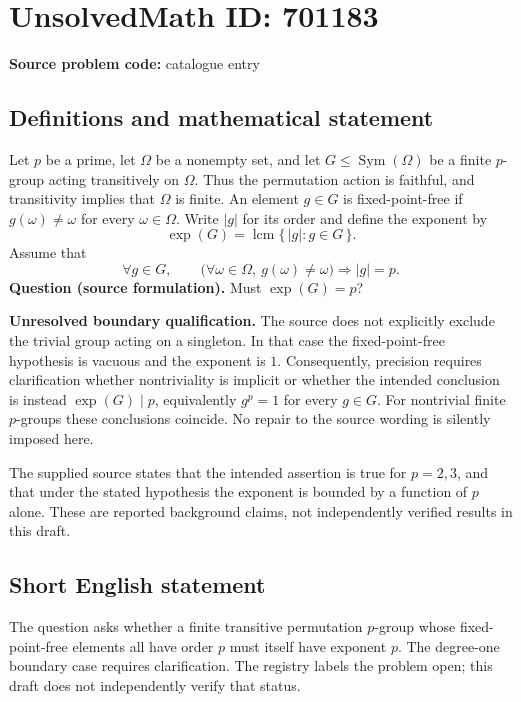 \documentclass[11pt]{article}
\begin{document}
\section*{UnsolvedMath ID: 701183}
\textbf{Source problem code:} catalogue entry
\subsection{Definitions and mathematical statement}
Let \(p\) be a prime, let \(\Omega\) be a nonempty set, and let \(G\leq\operatorname{Sym}(\Omega)\) be a finite \(p\)-group acting transitively on \(\Omega\). Thus the permutation action is faithful, and transitivity implies that \(\Omega\) is finite. An element \(g\in G\) is fixed-point-free if \(g(\omega)\ne\omega\) for every \(\omega\in\Omega\). Write \(|g|\) for its order and define the exponent by
\[
\exp(G)=\operatorname{lcm}\{\,|g|:g\in G\,\}.
\]
Assume that
\[
\forall g\in G,\qquad
\bigl(\forall\omega\in\Omega,\ g(\omega)\ne\omega\bigr)
\Longrightarrow |g|=p.
\]
\textbf{Question (source formulation).} Must \(\exp(G)=p\)?

\textbf{Unresolved boundary qualification.} The source does not explicitly exclude the trivial group acting on a singleton. In that case the fixed-point-free hypothesis is vacuous and the exponent is \(1\). Consequently, precision requires clarification whether nontriviality is implicit or whether the intended conclusion is instead \(\exp(G)\mid p\), equivalently \(g^p=1\) for every \(g\in G\). For nontrivial finite \(p\)-groups these conclusions coincide. No repair to the source wording is silently imposed here.

The supplied source states that the intended assertion is true for \(p=2,3\), and that under the stated hypothesis the exponent is bounded by a function of \(p\) alone. These are reported background claims, not independently verified results in this draft.
\subsection{Short English statement}
The question asks whether a finite transitive permutation \(p\)-group whose fixed-point-free elements all have order \(p\) must itself have exponent \(p\). The degree-one boundary case requires clarification. The registry labels the problem open; this draft does not independently verify that status.
\end{document}
